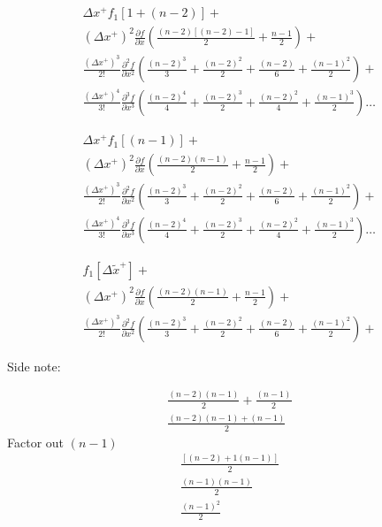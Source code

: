 \documentclass[12pt]{article}
\begin{document}
\begin{align*}
    \Delta x^+ f_1\left[ 1 + (n - 2)  \right] + \\
    (\Delta x^+)^2 \frac{\partial f}{\partial x } \left(
    \frac{(n-2)[\left( n-2 \right)-1]}{2} + \frac{n-1}{2} \right) + \\
        \frac{(\Delta x^+)^3}{2!} \frac{\partial^2 f}{\partial x^2 } \left(
        \frac{(n-2)^3}{3} + \frac{(n-2)^2}{2} + \frac{(n-2)}{6} + \frac{(n-1)^2}{2} \right)  + \\
    \frac{(\Delta x^+)^4}{3!} \frac{\partial^3 f}{\partial x^3 } \left(
    \frac{(n-2)^4}{4} + \frac{(n-2)^3}{2} + \frac{(n-2)^2}{4} + \frac{(n-1)^3}{2} \right) \dots
\end{align*}

\begin{align*}
    \Delta x^+ f_1\left[ (n - 1)  \right] + \\
    (\Delta x^+)^2 \frac{\partial f}{\partial x } \left(
    \frac{(n-2)\left( n-1 \right)}{2} + \frac{n-1}{2} \right) + \\
        \frac{(\Delta x^+)^3}{2!} \frac{\partial^2 f}{\partial x^2 } \left(
        \frac{(n-2)^3}{3} + \frac{(n-2)^2}{2} + \frac{(n-2)}{6} + \frac{(n-1)^2}{2} \right)  + \\
    \frac{(\Delta x^+)^4}{3!} \frac{\partial^3 f}{\partial x^3 } \left(
    \frac{(n-2)^4}{4} + \frac{(n-2)^3}{2} + \frac{(n-2)^2}{4} + \frac{(n-1)^3}{2} \right) \dots
\end{align*}

\begin{align*}
     f_1\left[ \Delta \widetilde{x}^+  \right] + \\
    (\Delta x^+)^2 \frac{\partial f}{\partial x } \left(
    \frac{(n-2)\left( n-1 \right)}{2} + \frac{n-1}{2} \right) + \\
        \frac{(\Delta x^+)^3}{2!} \frac{\partial^2 f}{\partial x^2 } \left(
        \frac{(n-2)^3}{3} + \frac{(n-2)^2}{2} + \frac{(n-2)}{6} + \frac{(n-1)^2}{2} \right)  + 
\end{align*}

Side note: 

\begin{align*}
    \frac{(n - 2)(n-1)}{2} + \frac{(n-1)}{2}\\
    \frac{(n - 2)(n-1) + (n-1)}{2} 
\end{align*}
Factor out $(n-1)$
\begin{align*}
    \frac{\left[ \left( n - 2 \right) + 1 \left( n - 1 \right) \right]}{2} \\
    \frac{\left( n-1 \right)\left( n - 1 \right)}{2} \\
    \frac{\left( n - 1 \right)^2}{2}
\end{align*}
\end{document}
